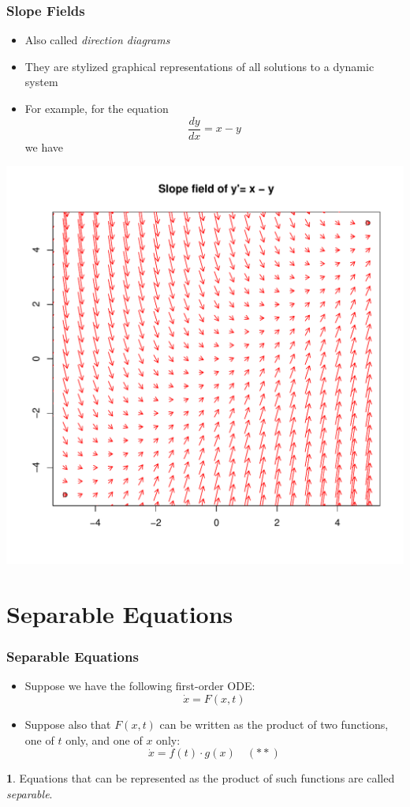 \documentclass[10pt,usenames,dvipsnames]{beamer}
\theoremstyle{definition}
\newtheorem{definition}{\translate{Definition}}
\begin{document}
\begin{frame}[fragile]
\frametitle{Slope Fields}
\begin{itemize}
	\item Also called \textit{direction diagrams}
	\item They are stylized graphical representations of all solutions to a dynamic system
	\item For example, for the equation 
	\[
		\dfrac{dy}{dx} = x - y 
	\]
	we have
\end{itemize}
\begin{center}
	\includegraphics[scale=0.3]{./graphs/fig1.pdf}
\end{center}

\end{frame}

\section{Separable Equations}
\begin{frame}[fragile]
\frametitle{Separable Equations}
\begin{itemize}
	\item Suppose we have the following first-order ODE:
	\[
		\dot{x} = F(x,t) 
	\]
	\item Suppose also that $F(x,t)$ can be written as the product of two functions, one of $t$ only, and one of $x$ only:
	\[
		\dot{x} = f(t)\cdot g(x)\quad (**)
	\]
\end{itemize}

\begin{definition}
	Equations that can be represented as the product of such functions are called \textit{separable}.
\end{definition}
\end{frame}
\end{document}
